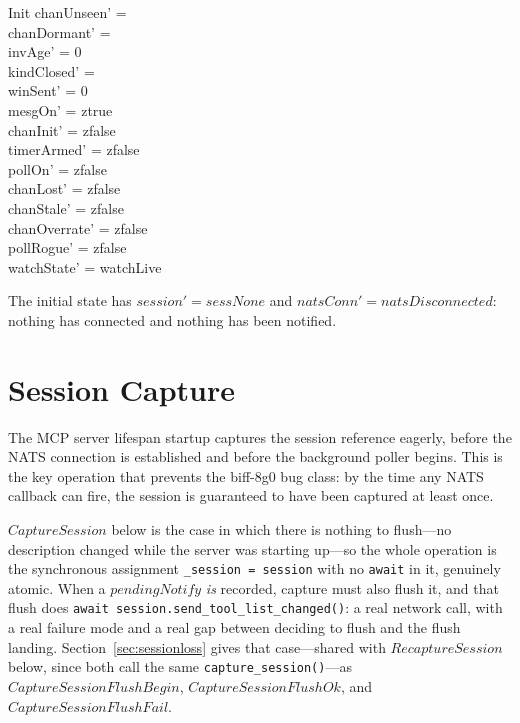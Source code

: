 \documentclass[a4paper,10pt,fleqn]{article}
\begin{document}
\begin{schema}{Init}
  chanUnseen' = \emptyset \\
  chanDormant' = \emptyset \\
  invAge' = 0 \\
  kindClosed' = \emptyset \\
  winSent' = 0 \\
  mesgOn' = ztrue \\
  chanInit' = zfalse \\
  timerArmed' = zfalse \\
  pollOn' = zfalse \\
  chanLost' = zfalse \\
  chanStale' = zfalse \\
  chanOverrate' = zfalse \\
  pollRogue' = zfalse \\
  watchState' = watchLive
\end{schema}

The initial state has $session' = sessNone$ and
$natsConn' = natsDisconnected$: nothing has connected and nothing has
been notified.

\section{Session Capture}
\label{sec:sessioncapture}

The MCP server lifespan startup captures the session reference
eagerly, before the NATS connection is established and before the
background poller begins.  This is the key operation that prevents
the biff-8g0 bug class: by the time any NATS callback can fire,
the session is guaranteed to have been captured at least once.

$CaptureSession$ below is the case in which there is nothing to
flush---no description changed while the server was starting up---so
the whole operation is the synchronous assignment
\texttt{\_session = session} with no \texttt{await} in it, genuinely
atomic.  When a $pendingNotify$ \emph{is} recorded, capture must also
flush it, and that flush does \texttt{await
session.send\_tool\_list\_changed()}: a real network call, with a real
failure mode and a real gap between deciding to flush and the flush
landing.  Section~\ref{sec:sessionloss} gives that case---shared with
$RecaptureSession$ below, since both call the same
\texttt{capture\_session()}---as $CaptureSessionFlushBegin$,
$CaptureSessionFlushOk$, and $CaptureSessionFlushFail$.
\end{document}
